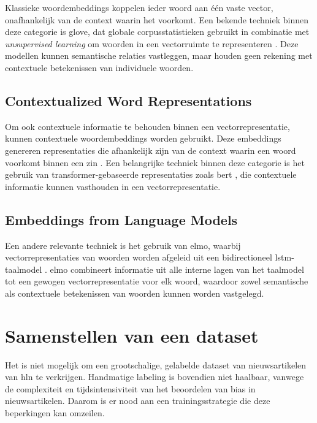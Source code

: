 Klassieke woordembeddings koppelen ieder woord aan één vaste vector, onafhankelijk van de context waarin het voorkomt. Een bekende techniek binnen deze categorie is \gls{glove}, dat globale corpusstatistieken gebruikt in combinatie met \textit{unsupervised learning} om woorden in een vectorruimte te representeren \autocite{Pennington2014}. Deze modellen kunnen semantische relaties vastleggen, maar houden geen rekening met contextuele betekenissen van individuele woorden.

\subsection{Contextualized Word Representations}

Om ook contextuele informatie te behouden binnen een vectorrepresentatie, kunnen contextuele woordembeddings worden gebruikt. Deze embeddings genereren representaties die afhankelijk zijn van de context waarin een woord voorkomt binnen een zin \autocite{Akbik2018}. Een belangrijke techniek binnen deze categorie is het gebruik van transformer-gebaseerde representaties zoals \gls{bert} \autocite{Khodake2020}, die contextuele informatie kunnen vasthouden in een vectorrepresentatie.

\subsection{Embeddings from Language Models}

Een andere relevante techniek is het gebruik van \gls{elmo}, waarbij vectorrepresentaties van woorden worden afgeleid uit een bidirectioneel \gls{lstm}-taalmodel \autocite{Peters2018}. \gls{elmo} combineert informatie uit alle interne lagen van het taalmodel tot een gewogen vectorrepresentatie voor elk woord, waardoor zowel semantische als contextuele betekenissen van woorden kunnen worden vastgelegd.

\section{Samenstellen van een dataset}
\label{sec:samenstellen-van-een-dataset}

Het is niet mogelijk om een grootschalige, gelabelde dataset van nieuwsartikelen van \gls{hln} te verkrijgen. Handmatige labeling is bovendien niet haalbaar, vanwege de complexiteit en tijdsintensiviteit van het beoordelen van bias in nieuwsartikelen. Daarom is er nood aan een trainingsstrategie die deze beperkingen kan omzeilen.

